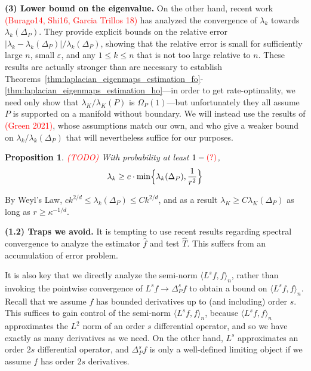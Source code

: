\documentclass{article}
\newcommand{\1}{\mathbf{1}}
\newcommand{\Leb}{L}
\newcommand{\dotp}[2]{\langle #1, #2 \rangle}
\newcommand{\wh}[1]{\widehat{#1}}
\theoremstyle{alden}
\theoremstyle{aldenthm}
\newtheorem{proposition}{Proposition}
\theoremstyle{definition}
\theoremstyle{remark}
\begin{document}
\textbf{(3) Lower bound on the eigenvalue.} On the other hand, recent work \textcolor{red}{(Burago14, Shi16, Garcia Trillos 18)} has analyzed the convergence of $\lambda_{k}$ towards $\lambda_{k}(\Delta_P)$. They provide explicit bounds on the relative error $|\lambda_{k} - \lambda_{k}(\Delta_P)|/\lambda_{k}(\Delta_P)$, showing that the relative error is small for sufficiently large $n$, small $\varepsilon$, and any $1 \leq k \leq n$ that is not too large relative to $n$. These results are actually stronger than are necessary to establish Theorems~\ref{thm:laplacian_eigenmaps_estimation_fo}-\ref{thm:laplacian_eigenmaps_estimation_ho}---in order to get rate-optimality, we need only show that $\lambda_{K}/\lambda_K(P)$ is $\Omega_P(1)$---but unfortunately they all assume $P$ is supported on a manifold without boundary. We will instead use the results of \textcolor{red}{(Green 2021)}, whose assumptions match our own, and who give a weaker bound on $\lambda_k/\lambda_k(\Delta_P)$ that will nevertheless suffice for our purposes. 

\begin{proposition}
	\label{prop:graph_eigenvalue}
	\textcolor{red}{(TODO)}
	With probability at least $1 - \textcolor{red}{(?)}$,
	\begin{equation*}
	\lambda_k \geq c \cdot \min\Bigl\{\lambda_k(\Delta_P), \frac{1}{r^{2}} \Bigr\}
	\end{equation*}
\end{proposition}
By Weyl's Law, $c k^{2/d} \leq \lambda_{k}(\Delta_P) \leq Ck^{2/d}$, and as a result $\lambda_{K} \geq C\lambda_{K}(\Delta_P)$ as long as $r \geq \kappa^{-1/d}$. 

\textbf{(1.2) Traps we avoid.} It is tempting to use recent results regarding spectral convergence to analyze the estimator $\wh{f}$ and test $\wh{T}$. This suffers from an accumulation of error problem. 

It is also key that we directly analyze the semi-norm $\dotp{L^s f}{f}_n$, rather than invoking the pointwise convergence of $L^{s}f \to \Delta_P^{s}f$ to obtain a bound on $\dotp{L^s f}{f}_n$. Recall that we assume $f$ has bounded derivatives up to (and including) order $s$. This suffices to gain control of the semi-norm $\dotp{L^s f}{f}_n$, because $\dotp{L^s f}{f}_n$ approximates the $\Leb^2$ norm of an order $s$ differential operator, and so we have exactly as many derivatives as we need. On the other hand, $L^s$ approximates an order $2s$ differential operator, and $\Delta_P^sf$ is only a well-defined limiting object if we assume $f$ has order $2s$ derivatives. 
\end{document}
